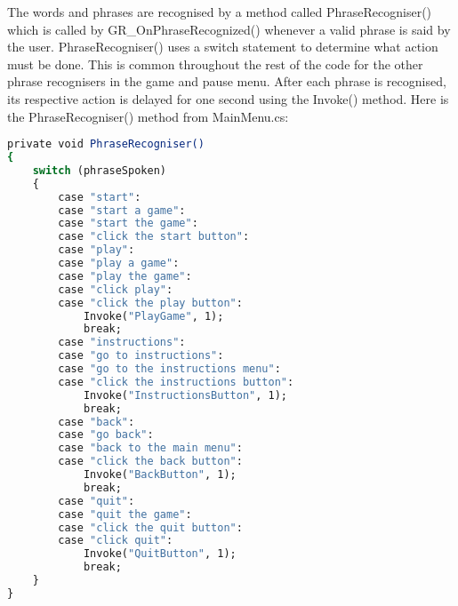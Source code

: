 \documentclass{article}
\begin{document}
The words and phrases are recognised by a method called PhraseRecogniser() which is called by GR\_OnPhraseRecognized() whenever a valid phrase is said by the user. PhraseRecogniser() uses a switch statement to determine what action must be done. This is common throughout the rest of the code for the other phrase recognisers in the game and pause menu. After each phrase is recognised, its respective action is delayed for one second using the Invoke() method. Here is the PhraseRecogniser() method from MainMenu.cs:
\begin{lstlisting}[language=csh]
private void PhraseRecogniser()
{
    switch (phraseSpoken)
    {
        case "start":
        case "start a game":
        case "start the game":
        case "click the start button":
        case "play":
        case "play a game":
        case "play the game":
        case "click play":
        case "click the play button":
            Invoke("PlayGame", 1);
            break;
        case "instructions":
        case "go to instructions":
        case "go to the instructions menu":
        case "click the instructions button":
            Invoke("InstructionsButton", 1);
            break;
        case "back":
        case "go back":
        case "back to the main menu":
        case "click the back button":
            Invoke("BackButton", 1);
            break;
        case "quit":
        case "quit the game":
        case "click the quit button":
        case "click quit":
            Invoke("QuitButton", 1);
            break;
    }
}
\end{lstlisting}
\end{document}

